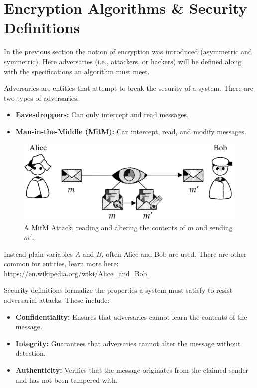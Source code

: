 \section{Encryption Algorithms \& Security Definitions}
\label{sec:enc}
\noindent
In the previous section the notion of encryption was introduced (asymmetric and symmetric).
Here adversaries (i.e., attackers, or hackers) will be defined along with the specifications an algorithm must meet.

\begin{Def}[Adversaries]

    \label{def:adversaries}
    Adversaries are entities that attempt to break the security of a system.
    There are two types of adversaries:
    \begin{itemize}
        \item \textbf{Eavesdroppers:} Can only intercept and read messages.
        \item \textbf{Man-in-the-Middle (MitM):} Can intercept, read, and modify messages.
    \end{itemize}
\end{Def}

\begin{figure}[h!]
    \centering
    \includegraphics[width=.8\textwidth]{Sections/sec/enc/mitm.png}
    \caption{A MitM Attack, reading and altering the contents of $m$ and sending $m'$.}
    \label{fig:adv}
\end{figure}

\noindent
Instead plain variables $A$ and $B$, often Alice and Bob are used. There are other common for entities, learn more here:
\href{https://en.wikipedia.org/wiki/Alice_and_Bob}{https://en.wikipedia.org/wiki/Alice\_and\_Bob}.

\newpage 
\begin{Def}

    \label{def:security_definitions}
    Security definitions formalize the properties a system must satisfy to resist adversarial attacks. These include:
    \begin{itemize}
        \item \textbf{Confidentiality:} Ensures that adversaries cannot learn the contents of the message.
        \item \textbf{Integrity:} Guarantees that adversaries cannot alter the message without detection.
        \item \textbf{Authenticity:} Verifies that the message originates from the claimed sender and has not been tampered with.
    \end{itemize}
\end{Def}

